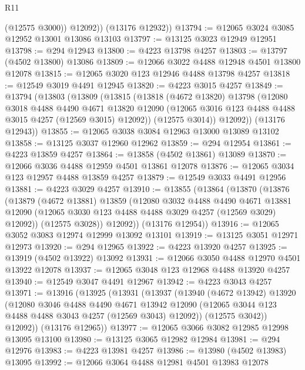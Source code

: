 \begin{lexlean}{R11}
\begin{coremodule}
            (@12575 @3000))
          @12092))
      (@13176 @12932))
@13794 := @12065 @3024 @3085 @12952 @13001 @13086 @13103
@13797 := @13125 @3023 @12949 @12951
@13798 := @294 @12943
@13800 := @4223 @13798 @4257
@13803 := @13797 (@4502 @13800) @13086
@13809 := @12066 @3022 @4488 @12948 @4501 @13800 @12078
@13815 := @12065 @3020 @123 @12946 @4488 @13798 @4257
@13818 := @12549 @3019 @4491 @12945
@13820 := @4223 @3015 @4257
@13849 := @13794
    (@13803
      (@13809
        (@13815
          (@13818
            (@4672 @13820)
            @13798
            (@12080
              @3018
              @4488
              @4490
              @4671
              @13820
              @12090
              (@12065 @3016 @123 @4488 @4488 @3015 @4257 (@12569 @3015) @12092))
            (@12575 @3014))
          @12092))
      (@13176 @12943))
@13855 := @12065 @3038 @3084 @12963 @13000 @13089 @13102
@13858 := @13125 @3037 @12960 @12962
@13859 := @294 @12954
@13861 := @4223 @13859 @4257
@13864 := @13858 (@4502 @13861) @13089
@13870 := @12066 @3036 @4488 @12959 @4501 @13861 @12078
@13876 := @12065 @3034 @123 @12957 @4488 @13859 @4257
@13879 := @12549 @3033 @4491 @12956
@13881 := @4223 @3029 @4257
@13910 := @13855
    (@13864
      (@13870
        (@13876
          (@13879
            (@4672 @13881)
            @13859
            (@12080
              @3032
              @4488
              @4490
              @4671
              @13881
              @12090
              (@12065 @3030 @123 @4488 @4488 @3029 @4257 (@12569 @3029) @12092))
            (@12575 @3028))
          @12092))
      (@13176 @12954))
@13916 := @12065 @3052 @3083 @12974 @12999 @13092 @13101
@13919 := @13125 @3051 @12971 @12973
@13920 := @294 @12965
@13922 := @4223 @13920 @4257
@13925 := @13919 (@4502 @13922) @13092
@13931 := @12066 @3050 @4488 @12970 @4501 @13922 @12078
@13937 := @12065 @3048 @123 @12968 @4488 @13920 @4257
@13940 := @12549 @3047 @4491 @12967
@13942 := @4223 @3043 @4257
@13971 := @13916
    (@13925
      (@13931
        (@13937
          (@13940
            (@4672 @13942)
            @13920
            (@12080
              @3046
              @4488
              @4490
              @4671
              @13942
              @12090
              (@12065 @3044 @123 @4488 @4488 @3043 @4257 (@12569 @3043) @12092))
            (@12575 @3042))
          @12092))
      (@13176 @12965))
@13977 := @12065 @3066 @3082 @12985 @12998 @13095 @13100
@13980 := @13125 @3065 @12982 @12984
@13981 := @294 @12976
@13983 := @4223 @13981 @4257
@13986 := @13980 (@4502 @13983) @13095
@13992 := @12066 @3064 @4488 @12981 @4501 @13983 @12078

\end{coremodule}
\end{lexlean}
